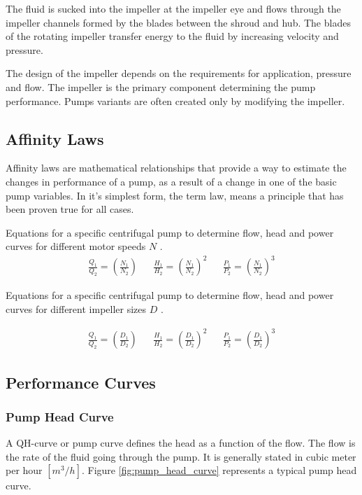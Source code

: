 The fluid is sucked into the impeller at the impeller eye and flows through the impeller channels formed by the 
blades between the shroud and hub.
The blades of the rotating impeller transfer energy to the fluid by increasing velocity and pressure.

The design of the impeller depends on the requirements for application, pressure and flow.
The impeller is the primary component determining the pump performance. 
Pumps variants are often created only by modifying the impeller.

\subsection{Affinity Laws}
Affinity laws are mathematical relationships that provide a way to estimate the changes in performance of a pump, 
as a result of a change in one of the basic pump variables.
In it's simplest form, the term law, means a principle that has been proven true for all cases.

Equations for a specific centrifugal pump to determine flow, head and power curves for different motor speeds $N$ \cite{Volk2014}.
\begin{align*}
	\frac{Q_1}{Q_2} = \left(\frac{N_1}{N_2}\right)   &&
	\frac{H_1}{H_2} = \left(\frac{N_1}{N_2}\right)^2 &&
	\frac{P_1}{P_2} = \left(\frac{N_1}{N_2}\right)^3	
\end{align*} 

Equations for a specific centrifugal pump to determine flow, head and power curves for different impeller sizes $D$ \cite{Volk2014}.

\begin{align*}
	\frac{Q_1}{Q_2} = \left(\frac{D_1}{D_2}\right)   &&
	\frac{H_1}{H_2} = \left(\frac{D_1}{D_2}\right)^2 &&
	\frac{P_1}{P_2} = \left(\frac{D_1}{D_2}\right)^3
\end{align*} 

\newpage

\subsection{Performance Curves}
\subsubsection{Pump Head Curve}
A QH-curve or pump curve defines the head as a function of the flow. The flow is the rate of the fluid going through the 
pump. It is generally stated in cubic meter per hour $[m^{3}/h]$. Figure \ref{fig:pump_head_curve} represents a typical pump head curve.


